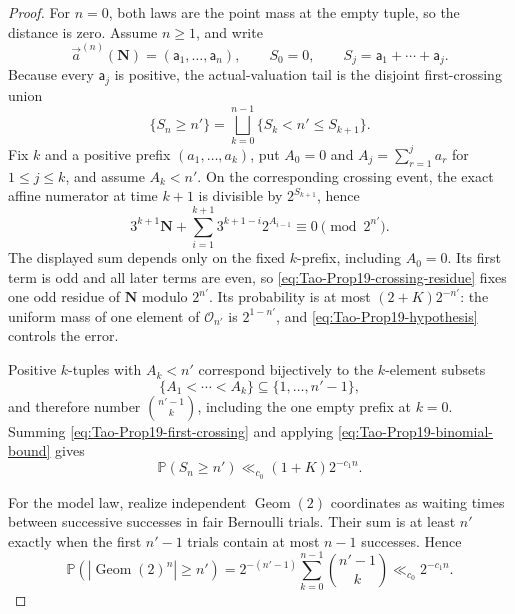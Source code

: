 \begin{proof}
For \(n=0\), both laws are the point mass at the empty tuple, so the distance
is zero.  Assume \(n\geq1\), and write
\[
 \vec a^{(n)}(\mathbf N)=(\mathsf a_1,\ldots,\mathsf a_n),
 \qquad
 S_0=0,\qquad S_j=\mathsf a_1+\cdots+\mathsf a_j.
\]
Because every \(\mathsf a_j\) is positive, the actual-valuation tail is the
disjoint first-crossing union
\begin{equation}
\label{eq:Tao-Prop19-first-crossing}
 \{S_n\geq n'\}
 =\bigsqcup_{k=0}^{n-1}\{S_k<n'\leq S_{k+1}\}.
\end{equation}
 Fix \(k\) and a positive prefix \((a_1,\ldots,a_k)\), put
 \(A_0=0\) and \(A_j=\sum_{r=1}^{j}a_r\) for \(1\leq j\leq k\), and assume
 \(A_k<n'\).
On the corresponding crossing event, the exact affine numerator at time
\(k+1\) is divisible by \(2^{S_{k+1}}\), hence
\begin{equation}
\label{eq:Tao-Prop19-crossing-residue}
 3^{k+1}\mathbf N+
 \sum_{i=1}^{k+1}3^{k+1-i}2^{A_{i-1}}
 \equiv0\pmod{2^{n'}}.
\end{equation}
The displayed sum depends only on the fixed \(k\)-prefix, including
\(A_0=0\).  Its first term is odd and all later terms are even, so
\eqref{eq:Tao-Prop19-crossing-residue} fixes one odd residue of
\(\mathbf N\) modulo \(2^{n'}\).  Its probability is at most
\((2+K)2^{-n'}\): the uniform mass of one element of \(\mathcal O_{n'}\) is
\(2^{1-n'}\), and \eqref{eq:Tao-Prop19-hypothesis} controls the error.

Positive \(k\)-tuples with \(A_k<n'\) correspond bijectively to the
\(k\)-element subsets
\[
 \{A_1<\cdots<A_k\}\subseteq\{1,\ldots,n'-1\},
\]
and therefore number \(\binom{n'-1}{k}\), including the one empty prefix at
\(k=0\).  Summing \eqref{eq:Tao-Prop19-first-crossing} and applying
\eqref{eq:Tao-Prop19-binomial-bound} gives
\begin{equation}
\label{eq:Tao-Prop19-actual-tail}
 \mathbb P(S_n\geq n')\ll_{c_0}(1+K)2^{-c_1n}.
\end{equation}

For the model law, realize independent \(\operatorname{Geom}(2)\)
coordinates as waiting times between successive successes in fair Bernoulli
trials.  Their sum is at least \(n'\) exactly when the first \(n'-1\) trials
contain at most \(n-1\) successes.  Hence
\begin{equation}
\label{eq:Tao-Prop19-model-tail}
 \mathbb P\left(|\operatorname{Geom}(2)^n|\geq n'\right)
 =2^{-(n'-1)}\sum_{k=0}^{n-1}\binom{n'-1}{k}
 \ll_{c_0}2^{-c_1n}.
\end{equation}


\end{proof}
